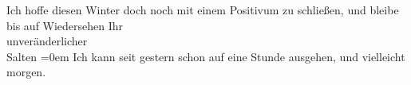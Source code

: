 \pstart
           Ich hoffe diesen Winter doch noch mit einem Positivum zu schließen, und bleibe
               bis auf Wiedersehen Ihr {\\[\baselineskip]}unveränderlicher {\\[\baselineskip]}\spacefill\mbox{Salten}\pend
           \leftskip=0em{}
\pstart
           \noindent{}Ich kann seit gestern schon auf eine Stunde
                  ausgehen, und \label{K_L03132-5v}\label{K_L03132-5} vielleicht morgen.\pend
           \endnumbering{}  \newcommand{\dateiname}{L03132}\newcommand{\titel}{Felix Salten an Arthur Schnitzler, [24. 1. 1894]}\newcommand{\editorInnen}{Martin Anton Müller und Laura Untner}
